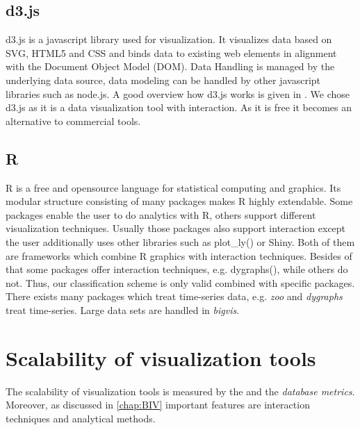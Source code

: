 \subsection*{d3.js}
d3.js is a javascript library used for visualization. It visualizes data based on SVG, HTML5 and CSS and binds data to existing web elements in alignment with the Document Object Model (DOM).  Data Handling is managed by the underlying data source, data modeling can be handled by other javascript libraries such as node.js. A good overview how d3.js works is given in \cite{Meeks}. 
We chose d3.js as it is a data visualization tool with interaction. As it is free it becomes an alternative to commercial tools.

\subsection*{R}
R is a free and opensource language for statistical computing and graphics. Its modular structure consisting of many packages makes R highly extendable\cite{R}. Some packages enable the user to do analytics with R, others support different visualization techniques. Usually those packages also support interaction except the user additionally uses other libraries such as plot\_ly() or Shiny. Both of them are frameworks which combine R graphics with interaction techniques. Besides of that some packages offer interaction techniques, e.g. dygraphs(), while others do not. Thus, our classification scheme is only valid combined with specific packages.
There exists many packages which treat time-series data, e.g. \textit{zoo} and \textit{dygraphs} treat time-series. Large data sets are handled in \textit{bigvis}.

\section{Scalability of visualization tools}\label{tool:scalability}
The scalability of visualization tools is measured by the  and the \textit{database metrics}. Moreover, as discussed in \ref{chap:BIV} important features are interaction techniques and analytical methods. 

